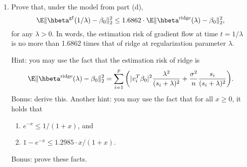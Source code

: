 \documentclass{article}
\begin{document}
\begin{enumerate}[label=(\alph*)]
\item Prove that, under the model from part (d), 
  \marginpar{\small [5 pts]}
  \[
  \E \|\hbeta^\gf(1/\lambda) - \beta_0\|_2^2 \leq 1.6862 \cdot \E
  \|\hbeta^\ridge(\lambda) - \beta_0\|_2^2,
  \]
  for any $\lambda > 0$. In words, the estimation risk of gradient flow at time
  $t = 1/\lambda$ is no more than 1.6862 times that of ridge at regularization 
  parameter $\lambda$.

  Hint: you may use the fact that the estimation risk of ridge is 
  \[
  \E \|\hbeta^\ridge(\lambda) - \beta_0\|_2^2 = \sum_{i=1}^p \bigg( |v_i^T
  \beta_0|^2 \frac{\lambda^2}{(s_i + \lambda)^2} + \frac{\sigma^2}{n}
  \frac{s_i}{(s_i + \lambda)^2} \bigg). 
  \]
  Bonus: derive this. Another hint: you may use the fact that for all $x \geq
  0$, it  
  holds that 
  \begin{enumerate}[label=(\roman*)]
  \item $e^{-x} \leq 1/(1+x)$, and
  \item $1-e^{-x} \leq 1.2985 \cdot x / (1+x)$.
  \end{enumerate}
  Bonus: prove these facts.
\end{enumerate}
\end{document}
